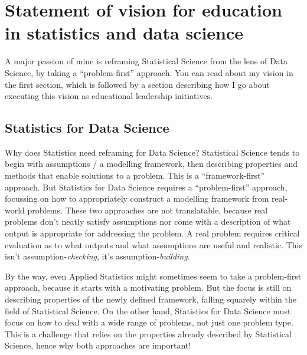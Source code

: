 \documentclass[]{article}
\begin{document}
\hypertarget{statement-of-vision-for-education-in-statistics-and-data-science}{%
\section{Statement of vision for education in statistics and data science}\label{statement-of-vision-for-education-in-statistics-and-data-science}}

A major passion of mine is reframing Statistical Science from the lens of Data Science, by taking a ``problem-first'' approach. You can read about my vision in the first section, which is followed by a section describing how I go about executing this vision as educational leadership initiatives.

\hypertarget{statistics-for-data-science}{%
\subsection{Statistics for Data Science}\label{statistics-for-data-science}}

Why does Statistics need reframing for Data Science? Statistical Science tends to begin with assumptions / a modelling framework, then describing properties and methods that enable solutions to a problem. This is a ``framework-first'' approach. But Statistics for Data Science requires a ``problem-first'' approach, focussing on how to appropriately construct a modelling framework from real-world problems. These two approaches are not translatable, because real problems don't neatly satisfy assumptions nor come with a description of what output is appropriate for addressing the problem. A real problem requires critical evaluation as to what outputs and what assumptions are useful and realistic. This isn't assumption-\emph{checking}, it's assumption-\emph{building}.

By the way, even Applied Statistics might sometimes seem to take a problem-first approach, because it starts with a motivating problem. But the focus is still on describing properties of the newly defined framework, falling squarely within the field of Statistical Science. On the other hand, Statistics for Data Science must focus on how to deal with a wide range of problems, not just one problem type. This is a challenge that relies on the properties already described by Statistical Science, hence why both approaches are important!
\end{document}
